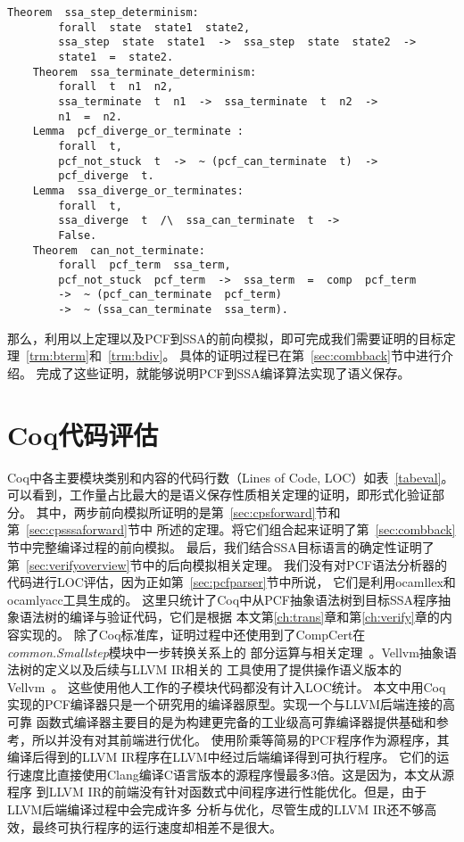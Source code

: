 \vspace{1ex}
\begin{lstlisting}[language=Coq, caption=Coq中后向模拟证明所需的定理, label=code:back]  
    Theorem  ssa_step_determinism:
        forall  state  state1  state2,
        ssa_step  state  state1  ->  ssa_step  state  state2  ->
        state1  =  state2.
    Theorem  ssa_terminate_determinism:
        forall  t  n1  n2,
        ssa_terminate  t  n1  ->  ssa_terminate  t  n2  ->
        n1  =  n2.
    Lemma  pcf_diverge_or_terminate :
        forall  t,
        pcf_not_stuck  t  ->  ~ (pcf_can_terminate  t)  -> 
        pcf_diverge  t.
    Lemma  ssa_diverge_or_terminates:
        forall  t,
        ssa_diverge  t  /\  ssa_can_terminate  t  ->
        False.
    Theorem  can_not_terminate:
        forall  pcf_term  ssa_term,
        pcf_not_stuck  pcf_term  ->  ssa_term  =  comp  pcf_term 
        ->  ~ (pcf_can_terminate  pcf_term)  
        ->  ~ (ssa_can_terminate  ssa_term).
\end{lstlisting}

那么，利用以上定理以及PCF到SSA的前向模拟，即可完成我们需要证明的目标定理~\ref{trm:bterm}和~\ref{trm:bdiv}。
具体的证明过程已在第~\ref{sec:combback}节中进行介绍。
完成了这些证明，就能够说明PCF到SSA编译算法实现了语义保存。

\section{Coq代码评估}

Coq中各主要模块类别和内容的代码行数（Lines of Code, LOC）如表~\ref{tabeval}。
可以看到，工作量占比最大的是语义保存性质相关定理的证明，即形式化验证部分。
其中，两步前向模拟所证明的是第~\ref{sec:cpsforward}节和第~\ref{sec:cpsssaforward}节中
所述的定理。将它们组合起来证明了第~\ref{sec:combback}节中完整编译过程的前向模拟。
最后，我们结合SSA目标语言的确定性证明了第~\ref{sec:verifyoverview}节中的后向模拟相关定理。
我们没有对PCF语法分析器的代码进行LOC评估，因为正如第~\ref{sec:pcfparser}节中所说，
它们是利用ocamllex和ocamlyacc工具生成的。
这里只统计了Coq中从PCF抽象语法树到目标SSA程序抽象语法树的编译与验证代码，它们是根据
本文第\ref{ch:trans}章和第\ref{ch:verify}章的内容实现的。
除了Coq标准库，证明过程中还使用到了CompCert在\textit{common.Smallstep}模块中一步转换关系上的
部分运算与相关定理~\cite{leroy2009formally}。Vellvm抽象语法树的定义以及后续与LLVM IR相关的
工具使用了提供操作语义版本的Vellvm~\cite{vellvm2012}。
这些使用他人工作的子模块代码都没有计入LOC统计。
本文中用Coq实现的PCF编译器只是一个研究用的编译器原型。实现一个与LLVM后端连接的高可靠
函数式编译器主要目的是为构建更完备的工业级高可靠编译器提供基础和参考，所以并没有对其前端进行优化。
使用阶乘等简易的PCF程序作为源程序，其编译后得到的LLVM IR程序在LLVM中经过后端编译得到可执行程序。
它们的运行速度比直接使用Clang编译C语言版本的源程序慢最多3倍。这是因为，本文从源程序
到LLVM IR的前端没有针对函数式中间程序进行性能优化。但是，由于LLVM后端编译过程中会完成许多
分析与优化，尽管生成的LLVM IR还不够高效，最终可执行程序的运行速度却相差不是很大。

